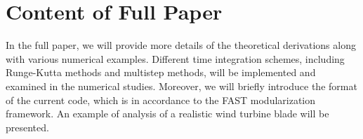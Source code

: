 \documentclass{aiaa-tc}
\begin{document}
 
 \section{Content of Full Paper}
In the full paper, we will provide more details of the theoretical
derivations along with various numerical examples. Different time integration schemes, including Runge-Kutta methods and multistep methods, will be implemented and examined in the numerical studies. Moreover, we will briefly introduce the format of the current code, which is in accordance to the FAST modularization framework. An example of analysis of a realistic wind turbine blade will be presented.




\end{document}
